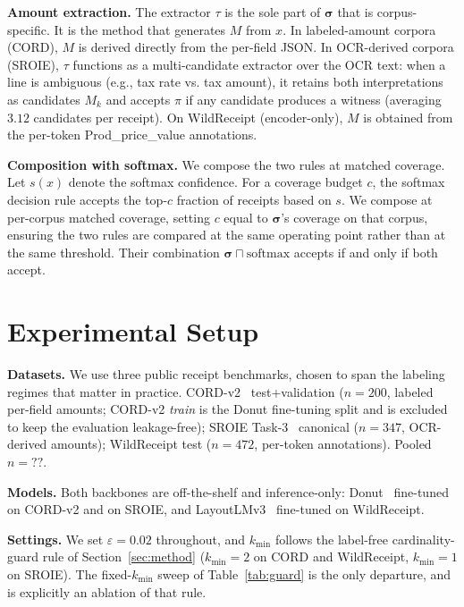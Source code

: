 \documentclass[conference]{IEEEtran}
\newcommand{\poolN}{??}
\let\IEEEsigma\sigma
\DeclareRobustCommand{\sigma}{{\boldsymbol{\IEEEsigma}}}
\begin{document}
\noindent\textbf{Amount extraction.} The extractor $\tau$ is the sole part of $\sigma$ that is corpus-specific. It is the method that generates $M$ from $x$. In labeled-amount corpora (CORD), $M$ is derived directly from the per-field JSON. In OCR-derived corpora (SROIE), $\tau$ functions as a multi-candidate extractor over the OCR text: when a line is ambiguous (e.g., tax rate vs. tax amount), it retains both interpretations as candidates $M_k$ and accepts $\pi$ if any candidate produces a witness (averaging $3.12$ candidates per receipt). On WildReceipt (encoder-only), $M$ is obtained from the per-token Prod_price_value annotations.

\noindent\textbf{Composition with softmax.} We compose the two rules at matched coverage. Let $s(x)$ denote the softmax confidence. For a coverage budget $c$, the softmax decision rule accepts the top-$c$ fraction of receipts based on $s$. We compose at per-corpus matched coverage, setting $c$ equal to $\sigma$'s coverage on that corpus, ensuring the two rules are compared at the same operating point rather than at the same threshold. Their combination $\sigma\sqcap\text{softmax}$ accepts if and only if both accept.
\section{Experimental Setup}
\label{sec:setup}

\noindent\textbf{Datasets.} We use three public receipt benchmarks, chosen to span the labeling regimes that matter in practice.
CORD-v2~\cite{park2019cord} test+validation ($n{=}200$,
labeled per-field amounts; CORD-v2 \emph{train} is the Donut
fine-tuning split and is excluded to keep the evaluation
leakage-free); SROIE Task-3~\cite{huang2019sroie} canonical
($n{=}347$, OCR-derived amounts); WildReceipt
\cite{sun2021wildreceipt} test ($n{=}472$, per-token annotations).
Pooled $n{=}\poolN{}$.

\noindent\textbf{Models.} Both backbones are off-the-shelf and inference-only: Donut~\cite{kim2022donut} fine-tuned on CORD-v2 and on SROIE, and
LayoutLMv3~\cite{huang2022layoutlmv3} fine-tuned on WildReceipt.

\noindent\textbf{Settings.} We set $\varepsilon{=}0.02$ throughout, and $k_{\min}$ follows the label-free cardinality-guard rule of
Section~\ref{sec:method} ($k_{\min}{=}2$ on CORD and WildReceipt,
$k_{\min}{=}1$ on SROIE). The fixed-$k_{\min}$ sweep of
Table~\ref{tab:guard} is the only departure, and is explicitly an
ablation of that rule.
\end{document}
